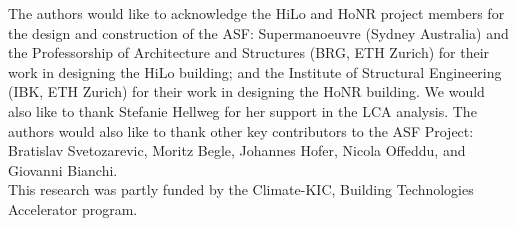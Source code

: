 
The authors would like to acknowledge the HiLo and HoNR project members for the design and construction of the ASF: Supermanoeuvre (Sydney Australia) and the Professorship of Architecture and Structures (BRG, ETH Zurich) for their work in designing the HiLo building; and the Institute of Structural Engineering (IBK, ETH Zurich) for their work in designing the HoNR building. We would also like to thank Stefanie Hellweg for her support in the LCA analysis. The authors would also like to thank other key contributors to the ASF Project: Bratislav Svetozarevic, Moritz Begle, Johannes Hofer, Nicola Offeddu, and Giovanni Bianchi. \\

This research was partly funded by the Climate-KIC, Building Technologies Accelerator program.
